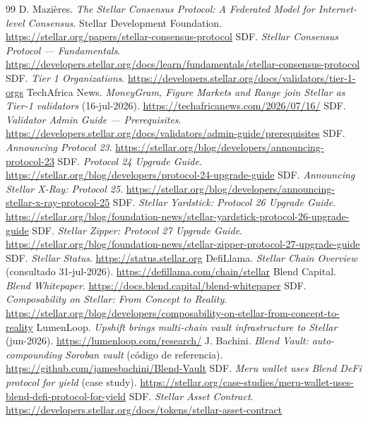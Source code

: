 \documentclass[twocolumn,10pt]{article}
\begin{document}
\begin{thebibliography}{99}\footnotesize
{} D. Mazi\`eres. \emph{The Stellar Consensus Protocol: A Federated Model for Internet-level Consensus}. Stellar Development Foundation. \url{https://stellar.org/papers/stellar-consensus-protocol}
 SDF. \emph{Stellar Consensus Protocol --- Fundamentals}. \url{https://developers.stellar.org/docs/learn/fundamentals/stellar-consensus-protocol}
 SDF. \emph{Tier 1 Organizations}. \url{https://developers.stellar.org/docs/validators/tier-1-orgs}
 TechAfrica News. \emph{MoneyGram, Figure Markets and Range join Stellar as Tier-1 validators} (16-jul-2026). \url{https://techafricanews.com/2026/07/16/}
 SDF. \emph{Validator Admin Guide --- Prerequisites}. \url{https://developers.stellar.org/docs/validators/admin-guide/prerequisites}
 SDF. \emph{Announcing Protocol 23}. \url{https://stellar.org/blog/developers/announcing-protocol-23}
 SDF. \emph{Protocol 24 Upgrade Guide}. \url{https://stellar.org/blog/developers/protocol-24-upgrade-guide}
 SDF. \emph{Announcing Stellar X-Ray: Protocol 25}. \url{https://stellar.org/blog/developers/announcing-stellar-x-ray-protocol-25}
 SDF. \emph{Stellar Yardstick: Protocol 26 Upgrade Guide}. \url{https://stellar.org/blog/foundation-news/stellar-yardstick-protocol-26-upgrade-guide}
 SDF. \emph{Stellar Zipper: Protocol 27 Upgrade Guide}. \url{https://stellar.org/blog/foundation-news/stellar-zipper-protocol-27-upgrade-guide}
 SDF. \emph{Stellar Status}. \url{https://status.stellar.org}
 DefiLlama. \emph{Stellar Chain Overview} (consultado 31-jul-2026). \url{https://defillama.com/chain/stellar}
 Blend Capital. \emph{Blend Whitepaper}. \url{https://docs.blend.capital/blend-whitepaper}
 SDF. \emph{Composability on Stellar: From Concept to Reality}. \url{https://stellar.org/blog/developers/composability-on-stellar-from-concept-to-reality}
 LumenLoop. \emph{Upshift brings multi-chain vault infrastructure to Stellar} (jun-2026). \url{https://lumenloop.com/research/}
 J. Bachini. \emph{Blend Vault: auto-compounding Soroban vault} (c\'odigo de referencia). \url{https://github.com/jamesbachini/Blend-Vault}
 SDF. \emph{Meru wallet uses Blend DeFi protocol for yield} (case study). \url{https://stellar.org/case-studies/meru-wallet-uses-blend-defi-protocol-for-yield}
 SDF. \emph{Stellar Asset Contract}. \url{https://developers.stellar.org/docs/tokens/stellar-asset-contract}

\end{thebibliography}
\end{document}
